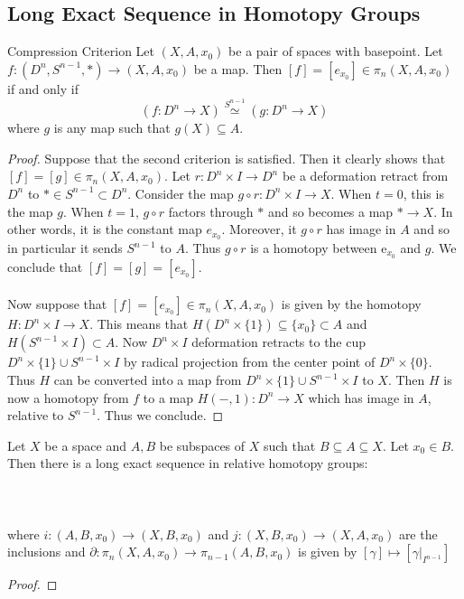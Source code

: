 \documentclass[a4paper]{article}
\begin{document}
\subsection{Long Exact Sequence in Homotopy Groups}
\begin{lmm}{Compression Criterion}{} Let $(X,A,x_0)$ be a pair of spaces with basepoint. Let $f:(D^n,S^{n-1},\ast)\to(X,A,x_0)$ be a map. Then $[f]=[e_{x_0}]\in\pi_n(X,A,x_0)$ if and only if $$(f:D^n\to X)\overset{S^{n-1}}{\simeq}(g:D^n\to X)$$ where $g$ is any map such that $g(X)\subseteq A$. \tcbline
\begin{proof}
Suppose that the second criterion is satisfied. Then it clearly shows that $[f]=[g]\in\pi_n(X,A,x_0)$. Let $r:D^n\times I\to D^n$ be a deformation retract from $D^n$ to $\ast\in S^{n-1}\subset D^n$. Consider the map $g\circ r:D^n\times I\to X$. When $t=0$, this is the map $g$. When $t=1$, $g\circ r$ factors through $\ast$ and so becomes a map $\ast\to X$. In other words, it is the constant map $e_{x_0}$. Moreover, it $g\circ r$ has image in $A$ and so in particular it sends $S^{n-1}$ to $A$. Thus $g\circ r$ is a homotopy between $\text{e}_{x_0}$ and $g$. We conclude that $[f]=[g]=[e_{x_0}]$. \\~\\

Now suppose that $[f]=[e_{x_0}]\in\pi_n(X,A,x_0)$ is given by the homotopy $H:D^n\times I\to X$. This means that $H(D^n\times\{1\})\subseteq\{x_0\}\subset A$ and $H(S^{n-1}\times I)\subset A$. Now $D^n\times I$ deformation retracts to the cup $D^n\times\{1\}\cup S^{n-1}\times I$ by radical projection from the center point of $D^n\times\{0\}$. Thus $H$ can be converted into a map from $D^n\times\{1\}\cup S^{n-1}\times I$ to $X$. Then $H$ is now a homotopy from $f$ to a map $H(-,1):D^n\to X$ which has image in $A$, relative to $S^{n-1}$. Thus we conclude. 
\end{proof}
\end{lmm}

\begin{thm}{}{} Let $X$ be a space and $A,B$ be subspaces of $X$ such that $B\subseteq A\subseteq X$. Let $x_0\in B$. Then there is a long exact sequence in relative homotopy groups: \\~\\
\\~\\
where $i:(A,B,x_0)\to(X,B,x_0)$ and $j:(X,B,x_0)\to(X,A,x_0)$ are the inclusions and $\partial:\pi_n(X,A,x_0)\to\pi_{n-1}(A,B,x_0)$ is given by $[\gamma]\mapsto[\gamma|_{I^{n-1}}]$ \tcbline
\begin{proof}{}{}
\end{proof}
\end{thm}
\end{document}
